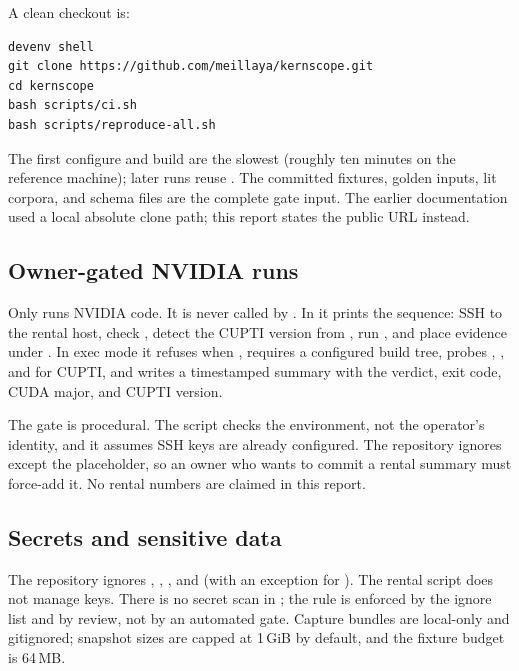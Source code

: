A clean checkout is:
\begin{lstlisting}
devenv shell
git clone https://github.com/meillaya/kernscope.git
cd kernscope
bash scripts/ci.sh
bash scripts/reproduce-all.sh
\end{lstlisting}
The first configure and build are the slowest (roughly ten minutes on the
reference machine); later runs reuse . The committed fixtures,
golden inputs, lit corpora, and schema files are the complete gate input. The
earlier documentation used a local absolute clone path; this report states the
public URL instead.

\subsection{Owner-gated NVIDIA runs}
\label{sec:rental-runbook}

Only  runs NVIDIA code. It is never called by
. In  it prints the sequence: SSH to the rental host,
check , detect the CUPTI version from , run
, and place evidence under
. In exec mode it refuses when , requires
a configured build tree, probes , , and
 for CUPTI, and writes a timestamped summary with the verdict,
exit code, CUDA major, and CUPTI version.

The gate is procedural. The script checks the environment, not the operator's
identity, and it assumes SSH keys are already configured. The repository
ignores  except the placeholder, so an owner who wants
to commit a rental summary must force-add it. No rental numbers are claimed in
this report.

\subsection{Secrets and sensitive data}
\label{sec:secrets}

The repository ignores , ,
, and  (with an exception for ).
The rental script does not manage keys. There is no secret scan in ;
the rule is enforced by the ignore list and by review, not by an automated
gate. Capture bundles are local-only and gitignored; snapshot sizes are capped
at 1\,GiB by default, and the fixture budget is 64\,MB.

